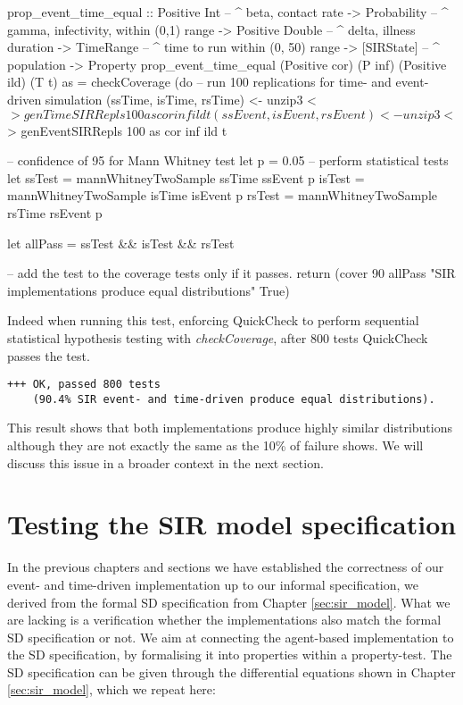 \begin{HaskellCode}
prop_event_time_equal :: Positive Int    -- ^ beta, contact rate
                      -> Probability     -- ^ gamma, infectivity, within (0,1) range
                      -> Positive Double -- ^ delta, illness duration
                      -> TimeRange       -- ^ time to run within (0, 50) range
                      -> [SIRState]      -- ^ population 
                      -> Property
prop_event_time_equal
    (Positive cor) (P inf) (Positive ild) (T t) as = checkCoverage (do
  -- run 100 replications for time- and event-driven simulation
  (ssTime, isTime, rsTime)    <- unzip3 <$> genTimeSIRRepls 100 as cor inf ild t
  (ssEvent, isEvent, rsEvent) <- unzip3 <$> genEventSIRRepls 100 as cor inf ild t
  
  -- confidence of 95 for Mann Whitney test
  let p = 0.05
  -- perform statistical tests
  let ssTest = mannWhitneyTwoSample ssTime ssEvent p
      isTest = mannWhitneyTwoSample isTime isEvent p
      rsTest = mannWhitneyTwoSample rsTime rsEvent p

  let allPass = ssTest && isTest && rsTest 

  -- add the test to the coverage tests only if it passes.
  return 
    (cover 90 allPass "SIR implementations produce equal distributions" True)
\end{HaskellCode}

Indeed when running this test, enforcing QuickCheck to perform sequential statistical hypothesis testing with \textit{checkCoverage}, after 800 tests QuickCheck passes the test.

\begin{verbatim}
+++ OK, passed 800 tests 
    (90.4% SIR event- and time-driven produce equal distributions).
\end{verbatim}

This result shows that both implementations produce highly similar distributions although they are not exactly the same as the 10\% of failure shows. We will discuss this issue in a broader context in the next section.

\section{Testing the SIR model specification}
In the previous chapters and sections we have established the correctness of our event- and time-driven implementation up to our informal specification, we derived from the formal SD specification from Chapter \ref{sec:sir_model}. What we are lacking is a verification whether the implementations also match the formal SD specification or not. We aim at connecting the agent-based implementation to the SD specification, by formalising it into properties within a property-test. The SD specification can be given through the differential equations shown in Chapter \ref{sec:sir_model}, which we repeat here:

